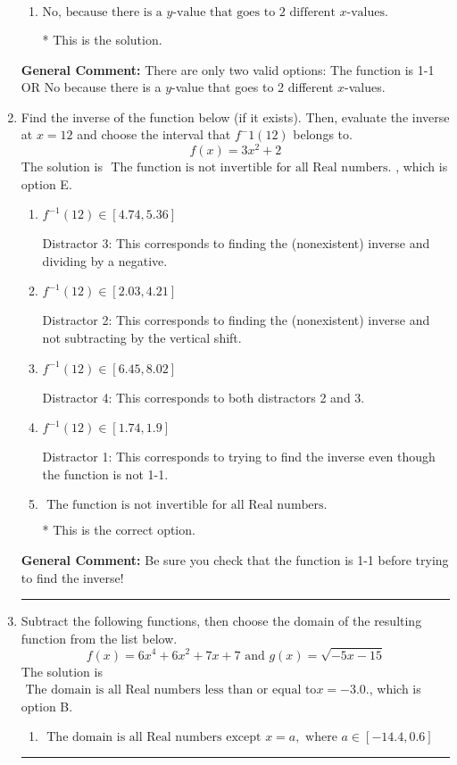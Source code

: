 \documentclass{extbook}[14pt]
\newcommand{\litem}[1]{\item #1

\rule{\textwidth}{0.4pt}}
\begin{document}
\begin{enumerate}
{\begin{enumerate}[label=\Alph*.]
Corresponds to believing 1-1 means the domain is all Real numbers.
\item \( \text{No, because there is a $y$-value that goes to 2 different $x$-values.} \)

* This is the solution.
\end{enumerate}

\textbf{General Comment:} There are only two valid options: The function is 1-1 OR No because there is a $y$-value that goes to 2 different $x$-values.
}
\litem{
Find the inverse of the function below (if it exists). Then, evaluate the inverse at $x = 12$ and choose the interval that $f^-1(12)$ belongs to.
\[ f(x) = 3 x^2 + 2 \]The solution is \( \text{ The function is not invertible for all Real numbers. } \), which is option E.\begin{enumerate}[label=\Alph*.]
\item \( f^{-1}(12) \in [4.74, 5.36] \)

 Distractor 3: This corresponds to finding the (nonexistent) inverse and dividing by a negative.
\item \( f^{-1}(12) \in [2.03, 4.21] \)

 Distractor 2: This corresponds to finding the (nonexistent) inverse and not subtracting by the vertical shift.
\item \( f^{-1}(12) \in [6.45, 8.02] \)

 Distractor 4: This corresponds to both distractors 2 and 3.
\item \( f^{-1}(12) \in [1.74, 1.9] \)

 Distractor 1: This corresponds to trying to find the inverse even though the function is not 1-1. 
\item \( \text{ The function is not invertible for all Real numbers. } \)

* This is the correct option.
\end{enumerate}

\textbf{General Comment:} Be sure you check that the function is 1-1 before trying to find the inverse!
}
\litem{
Subtract the following functions, then choose the domain of the resulting function from the list below.
\[ f(x) = 6x^{4} +6 x^{2} +7 x + 7 \text{ and } g(x) = \sqrt{-5x-15}  \]The solution is \( \text{ The domain is all Real numbers less than or equal to} x = -3.0. \), which is option B.\begin{enumerate}[label=\Alph*.]
\item \( \text{ The domain is all Real numbers except } x = a, \text{ where } a \in [-14.4, 0.6] \)



\end{enumerate}}
\end{enumerate}
\end{document}

